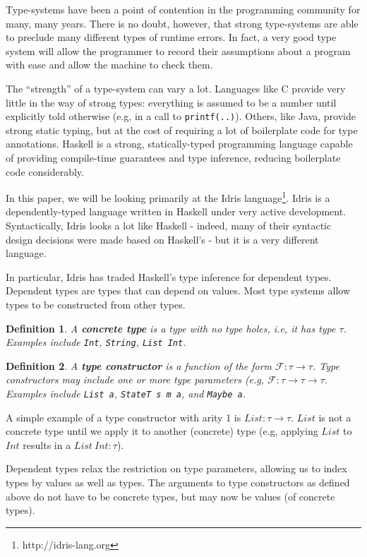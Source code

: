 \documentclass[12pt]{article}
\newtheorem{defn}{Definition}[section]
\begin{document}
Type-systems have been a point of contention in the programming community for many, many years.
There is no doubt, however, that strong type-systems are able to preclude many different types of runtime errors.
In fact, a very good type system will allow the programmer to record their assumptions about a program with ease and allow the machine to check them.

The ``strength'' of a type-system can vary a lot.
Languages like C provide very little in the way of strong types: everything is assumed to be a number until explicitly told otherwise (e.g, in a call to \texttt{printf(..)}).
Others, like Java, provide strong static typing, but at the cost of requiring a lot of boilerplate code for type annotations.
Haskell is a strong, statically-typed programming language capable of providing compile-time guarantees and type inference, reducing boilerplate code considerably.

In this paper, we will be looking primarily at the Idris language\footnote{http://idris-lang.org}.
Idris is a dependently-typed language written in Haskell under very active development.
Syntactically, Idris looks a lot like Haskell - indeed, many of their syntactic design decisions were made based on Haskell's - but it is a very different language.

In particular, Idris has traded Haskell's type inference for dependent types.
Dependent types are types that can depend on values.
Most type systems allow types to be constructed from other types.

\begin{defn}
  A \textbf{concrete type} is a type with no type holes, i.e, it has type $\tau$. Examples include \texttt{Int}, \texttt{String}, \texttt{List Int}.
\end{defn}

\begin{defn}
  A \textbf{type constructor} is a function of the form
  $\mathcal{F} : \tau \rightarrow \tau$. Type constructors may include one or more type parameters (e.g, $\mathcal{F} : \tau \rightarrow \tau \rightarrow \tau$.
  Examples include \texttt{List a}, \texttt{StateT s m a}, and \texttt{Maybe a}.
\end{defn}

A simple example of a type constructor with arity 1 is $List : \tau \rightarrow \tau$.
$List$ is not a concrete type until we apply it to another (concrete) type (e.g, applying $List$ to $Int$ results in a $List\ Int : \tau$).

Dependent types relax the restriction on type parameters, allowing us to index types by values as well as types.
The arguments to type constructors as defined above do not have to be concrete types, but may now be values (of concrete types).
\end{document}
